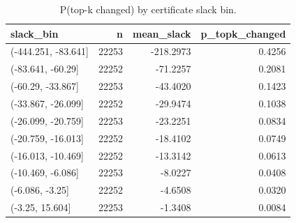 \begin{table}
\caption{P(top-k changed) by certificate slack bin.}
\label{tab:slack_bin_analysis}
\begin{tabular}{lrrr}
\toprule
slack_bin & n & mean_slack & p_topk_changed \\
\midrule
(-444.251, -83.641] & 22253 & -218.2973 & 0.4256 \\
(-83.641, -60.29] & 22252 & -71.2257 & 0.2081 \\
(-60.29, -33.867] & 22253 & -43.4020 & 0.1423 \\
(-33.867, -26.099] & 22252 & -29.9474 & 0.1038 \\
(-26.099, -20.759] & 22253 & -23.2251 & 0.0834 \\
(-20.759, -16.013] & 22252 & -18.4102 & 0.0749 \\
(-16.013, -10.469] & 22252 & -13.3142 & 0.0613 \\
(-10.469, -6.086] & 22253 & -8.0227 & 0.0408 \\
(-6.086, -3.25] & 22252 & -4.6508 & 0.0320 \\
(-3.25, 15.604] & 22253 & -1.3408 & 0.0084 \\
\bottomrule
\end{tabular}
\end{table}
